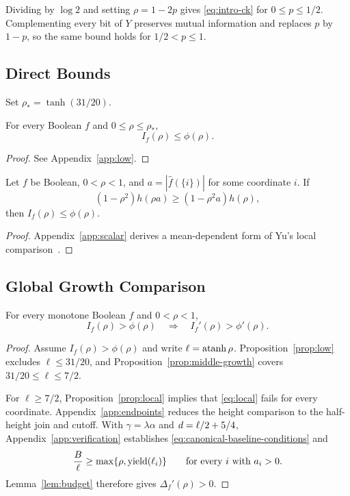 Dividing by \(\log2\) and setting \(\rho=1-2p\) gives
\eqref{eq:intro-ck} for \(0\le p\le1/2\). Complementing every bit of
\(Y\) preserves mutual information and replaces \(p\) by \(1-p\),
so the same bound holds for \(1/2<p\le1\).

\subsection{Direct Bounds}

Set \(\rho_*=\tanh(31/20)\).

\begin{proposition}\label{prop:low}
For every Boolean \(f\) and \(0\le\rho\le\rho_*\),
\[
 I_f(\rho)\le\phi(\rho).
\]
\end{proposition}
\begin{proof}
See Appendix~\ref{app:low}.
\end{proof}

\begin{proposition}\label{prop:local}
Let \(f\) be Boolean, \(0<\rho<1\), and
\(a=|\widehat f(\{i\})|\) for some coordinate \(i\).
If
\begin{equation}
 (1-\rho^2)h(\rho a)\ge(1-\rho^2a)h(\rho),
 \label{eq:local}
\end{equation}
then \(I_f(\rho)\le\phi(\rho)\).
\end{proposition}
\begin{proof}
Appendix~\ref{app:scalar} derives a mean-dependent form of Yu's local
comparison~\cite[Theorem~4.6 and Remark~4.7]{Yu}.
\end{proof}

\subsection{Global Growth Comparison}

\begin{lemma}\label{lem:coverage}
For every monotone Boolean \(f\) and \(0<\rho<1\),
\[
 I_f(\rho)>\phi(\rho)
 \quad\Longrightarrow\quad I_f'(\rho)>\phi'(\rho).
\]
\end{lemma}

\begin{proof}
Assume \(I_f(\rho)>\phi(\rho)\) and write \(\ell=\operatorname{atanh}\rho\).
Proposition~\ref{prop:low} excludes \(\ell\le31/20\), and
Proposition~\ref{prop:middle-growth} covers
\(31/20\le\ell\le7/2\).

For \(\ell\ge7/2\), Proposition~\ref{prop:local} implies that
\eqref{eq:local} fails for every coordinate.
Appendix~\ref{app:endpoints} reduces the height comparison to
the half-height join and cutoff. With \(\gamma=\lambda\alpha\)
and \(d=\ell/2+5/4\), Appendix~\ref{app:verification}
establishes \eqref{eq:canonical-baseline-conditions} and
\[
 \frac B\ell\ge\max\{\rho,\operatorname{yield}(\ell_i)\}
 \qquad\text{for every }i\text{ with }a_i>0.
\]
Lemma~\ref{lem:budget} therefore gives \(\Delta_f'(\rho)>0\).
\end{proof}

